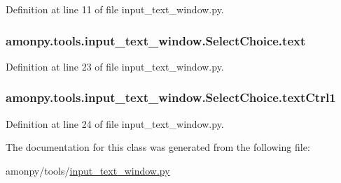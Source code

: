 Definition at line 11 of file input\-\_\-text\-\_\-window.\-py.

\hypertarget{classamonpy_1_1tools_1_1input__text__window_1_1_select_choice_a6983cf49c1516c4653cad8e3663dbb38}{
\subsubsection[{text}]{\setlength{\rightskip}{0pt plus 5cm}amonpy.\-tools.\-input\-\_\-text\-\_\-window.\-Select\-Choice.\-text}}\label{classamonpy_1_1tools_1_1input__text__window_1_1_select_choice_a6983cf49c1516c4653cad8e3663dbb38}


Definition at line 23 of file input\-\_\-text\-\_\-window.\-py.

\hypertarget{classamonpy_1_1tools_1_1input__text__window_1_1_select_choice_aab6b0771ae4ce1d7f51e5a7cd8cb3c3d}{
\subsubsection[{text\-Ctrl1}]{\setlength{\rightskip}{0pt plus 5cm}amonpy.\-tools.\-input\-\_\-text\-\_\-window.\-Select\-Choice.\-text\-Ctrl1}}\label{classamonpy_1_1tools_1_1input__text__window_1_1_select_choice_aab6b0771ae4ce1d7f51e5a7cd8cb3c3d}


Definition at line 24 of file input\-\_\-text\-\_\-window.\-py.



The documentation for this class was generated from the following file\-:\begin{DoxyCompactItemize}
\item 
amonpy/tools/\hyperlink{input__text__window_8py}{input\-\_\-text\-\_\-window.\-py}\end{DoxyCompactItemize}

